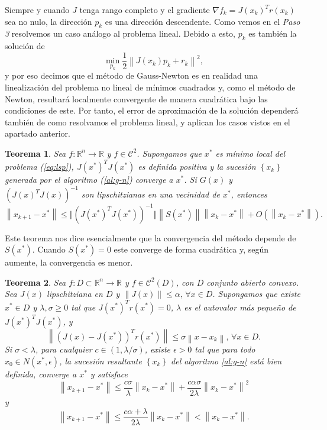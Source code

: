 \documentclass[11pt,a4paper]{book}
\newtheorem{theorem}{Teorema}[chapter]
\theoremstyle{definition}
\theoremstyle{remark}
\newcommand{\norm}[1]{\left\lVert#1\right\rVert}
\newcommand{\sucesionxk}{\left\{x_k\right\}}
\begin{document}
Siempre y cuando $J$ tenga rango completo y el gradiente $\nabla f_k = J(x_k)^Tr(x_k)$ sea no nulo, la dirección $p_k$ es una dirección descendente.
Como vemos en el \textit{Paso 3} resolvemos un caso análogo al problema lineal. Debido a esto, $p_k$ es también la solución de
\begin{equation}
	\min_{p_k} \frac{1}{2} \norm{J(x_k)p_k + r_k}^2,
\end{equation}
y por eso decimos que el método de Gauss-Newton es en realidad una linealización del problema no lineal de mínimos cuadrados y, como el método de Newton, resultará localmente convergente de manera cuadrática bajo las condiciones de este.
Por tanto, el error de aproximación de la solución dependerá también de como resolvamos el problema lineal, y aplican los casos vistos en el apartado anterior.

\begin{theorem}
	\label{th:gn1}
	Sea $f: \mathbb{R}^n \rightarrow \mathbb{R}$ y $f \in \mathcal{C}^2$. Supongamos que $x^*$ es mínimo local del problema (\ref{eq:lsp}), $J(x^*)^TJ(x^*)$ es definida positiva y la sucesión $\sucesionxk$ generada por el algoritmo (\ref{al:g-n}) converge a $x^*$. Si $G(x)$ y $(J(x)^TJ(x))^{-1}$ son lipschitzianas en una vecinidad de $x^*$, entonces
\begin{equation}
	\norm{x_{k+1}-x^*} \leq \Vert (J(x^*)^TJ(x^*))^{-1} \Vert \norm{S(x^*)} \norm{x_k-x^*}
	+ O(\norm{x_k-x^*}).
\end{equation}
\end{theorem}

Este teorema nos dice esencialmente que la convergencia del método depende de $S(x^*)$. Cuando $S(x^*)=0$ este converge de forma cuadrática y, según aumente, la convergencia es menor.

\begin{theorem}
	\label{th:gn2}
	Sea $f:D \subset \mathbb{R}^n \rightarrow \mathbb{R}$ y $f \in \mathcal{C}^2(D)$, con $D$ conjunto abierto convexo. Sea $J(x)$ lipschitziana en $D$ y $\norm{J(x)} \leq \alpha, \, \forall x \in D$. Supongamos que existe $x^* \in D$ y $\lambda, \sigma \geq 0$ tal que $J(x^*)^Tr(x^*)=0$,
$\lambda$ es el autovalor más pequeño de $J(x^*)^TJ(x^*)$, y
	\begin{equation}
		\norm{(J(x)-J(x^*))^Tr(x^*)} \leq \sigma \norm{x-x_k},\,\forall x \in D.
	\end{equation}
	Si $\sigma < \lambda$, para cualquier $c\in (1,\lambda / \sigma)$, existe $\epsilon > 0$ tal que para todo $x_0 \in N(x^*, \epsilon)$, la sucesión resultante $\sucesionxk$ del algoritmo \ref{al:g-n} está bien definida, converge a $x^*$ y satisface
	\begin{equation}
	\norm{x_{k+1}-x^*} \leq \frac{c\sigma}{\lambda} \norm{x_k-x^*}+\frac{c\alpha\sigma}{2\lambda}\norm{x_k-x^*}^2
	\end{equation}
	y
	\begin{equation}
	\norm{x_{k+1}-x^*} \leq \frac{c\alpha+\lambda}{2\lambda}\norm{x_k-x^*} < \norm{x_k-x^*}.
	\end{equation}
\end{theorem}
\end{document}
